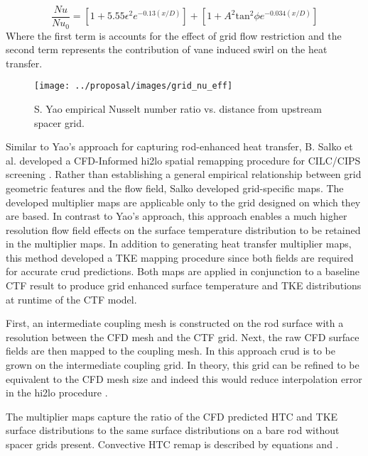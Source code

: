 \begin{equation}
\frac{Nu}{Nu_0}  = \left[ 1 + 5.55 \epsilon^2 e^{-0.13(x/D)}\right] + \left[ 1 + A^2\mathrm{tan}^2\phi e^{-0.034(x/D)} \right]
\label{eq:yao_htc}
\end{equation}
Where the first term is accounts for the effect of grid flow restriction and the second term represents the contribution of vane induced swirl on the heat transfer.

\begin{figure}[H]
    \centering
    \texttt{[image: ../proposal/images/grid\_nu\_eff]}
    \caption{S. Yao empirical Nusselt number ratio vs. distance from upstream spacer grid.}
    \label{fig:gridnueff}
\end{figure}

    Similar to Yao's approach for capturing rod-enhanced heat transfer,  B. Salko et al. developed a CFD-Informed hi2lo spatial remapping procedure for CILC/CIPS screening \cite{salko17}.  Rather than establishing a general empirical relationship between grid geometric features and the flow field, Salko developed grid-specific maps.  The developed multiplier maps are applicable only to the grid designed on which they are based.  In contrast to Yao's approach, this approach enables a much higher resolution flow field effects on the surface temperature distribution to be retained in the multiplier maps.  In addition to generating heat transfer multiplier maps, this method developed a TKE mapping procedure since both fields are required for accurate crud predictions.  Both maps are applied in conjunction to a baseline CTF result to produce grid enhanced surface temperature and TKE distributions at runtime of the CTF model.
    
    First, an intermediate coupling mesh is constructed on the rod surface with a resolution between the CFD mesh and the CTF grid.  Next, the raw CFD surface fields are then mapped to the coupling mesh.  In this approach crud is to be grown on the intermediate coupling grid.  In theory, this grid can be refined to be equivalent to the CFD mesh size and indeed this would reduce interpolation error in the hi2lo procedure \cite{salko17}.
       
    The multiplier maps capture the ratio of the CFD predicted HTC and TKE surface distributions to the same surface distributions on a bare rod without spacer grids present.
    Convective HTC remap is described by equations \label{eq:htc_remap_ctf_1} and \label{eq:htc_remap_ctf_2}.
    
